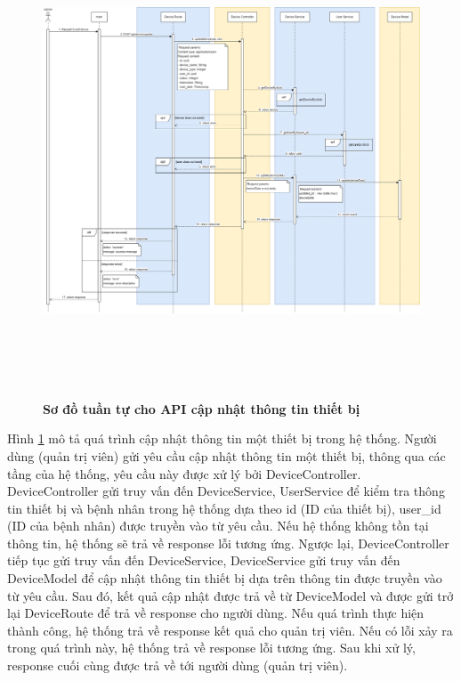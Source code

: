 \begin{figure}[H]
  \centering
  \includegraphics[width=16cm,height=14cm]{Images/sequence_api/editDevice.png}
  \caption[Sơ đồ tuần tự cho API cập nhật thông tin thiết bị ]{\bfseries \fontsize{12pt}{0pt}
  \selectfont Sơ đồ tuần tự cho API cập nhật thông tin thiết bị }
  \label{api_editDevice} %
\end{figure}
Hình \ref{api_editDevice} mô tả quá trình cập nhật thông tin một thiết bị trong hệ thống. Người dùng (quản trị viên) gửi yêu cầu cập nhật thông tin một thiết bị, thông qua các tầng của hệ thống, 
yêu cầu này được xử lý bởi DeviceController. DeviceController gửi truy vấn đến DeviceService, UserService để kiểm tra thông tin thiết bị và bệnh nhân trong hệ thống dựa theo id (ID của thiết bị),
 user\_id (ID của bệnh nhân) được truyền vào từ yêu cầu. Nếu hệ thống không tồn tại thông tin, hệ thống sẽ trả về response lỗi tương ứng. Ngược lại, DeviceController tiếp tục gửi truy vấn đến DeviceService, 
 DeviceService gửi truy vấn đến DeviceModel để cập nhật thông tin thiết bị dựa trên thông tin được truyền vào từ yêu cầu. Sau đó, kết quả cập nhật được trả về từ DeviceModel và được gửi trở lại DeviceRoute để 
 trả về response cho người dùng. Nếu quá trình thực hiện thành công, hệ thống trả về response kết quả cho quản trị viên. Nếu có lỗi xảy ra trong quá trình này, hệ thống trả về response lỗi tương ứng. Sau khi xử lý, response cuối cùng được trả về tới người dùng (quản trị viên).

